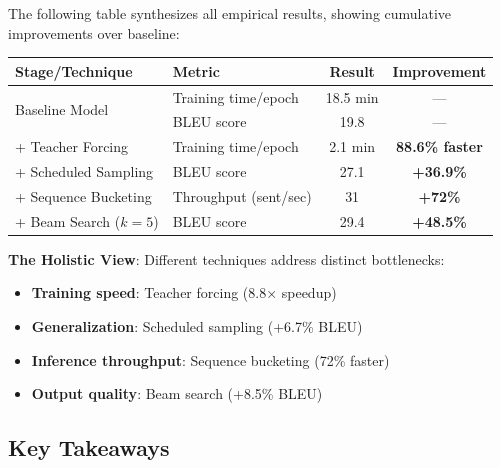 \documentclass{article}
\begin{document}
The following table synthesizes all empirical results, showing cumulative improvements over baseline:

\begin{center}
\small
\begin{tabular}{|l|l|c|c|}
\hline
\textbf{Stage/Technique} & \textbf{Metric} & \textbf{Result} & \textbf{Improvement} \\
\hline
\multirow{2}{*}{Baseline Model} & Training time/epoch & 18.5 min & — \\
 & BLEU score & 19.8 & — \\
\hline
+ Teacher Forcing & Training time/epoch & 2.1 min & \textbf{88.6\% faster} \\
\hline
+ Scheduled Sampling & BLEU score & 27.1 & \textbf{+36.9\%} \\
\hline
+ Sequence Bucketing & Throughput (sent/sec) & 31 & \textbf{+72\%} \\
\hline
+ Beam Search ($k=5$) & BLEU score & 29.4 & \textbf{+48.5\%} \\
\hline
\end{tabular}
\end{center}

\vspace{0.5cm}

\textbf{The Holistic View}: Different techniques address distinct bottlenecks:
\begin{itemize}
\item \textbf{Training speed}: Teacher forcing (8.8× speedup)
\item \textbf{Generalization}: Scheduled sampling (+6.7\% BLEU)
\item \textbf{Inference throughput}: Sequence bucketing (72\% faster)
\item \textbf{Output quality}: Beam search (+8.5\% BLEU)
\end{itemize}

\subsection{Key Takeaways}
\end{document}

